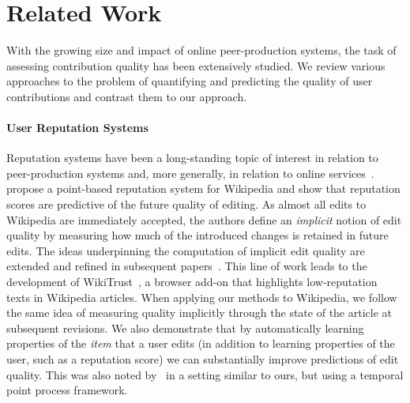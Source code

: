 \section{Related Work}
\label{pps:sec:relwork}

With the growing size and impact of online peer-production systems, the task of assessing contribution quality has been extensively studied.
We review various approaches to the problem of quantifying and predicting the quality of user contributions and contrast them to our approach.

\paragraph{User Reputation Systems}
Reputation systems have been a long-standing topic of interest in relation to peer-production systems and, more generally, in relation to online services~\citep{resnick2000reputation}.
\citet{adler2007content} propose a point-based reputation system for Wikipedia and show that reputation scores are predictive of the future quality of editing.
As almost all edits to Wikipedia are immediately accepted, the authors define an \emph{implicit} notion of edit quality by measuring how much of the introduced changes is retained in future edits.
The ideas underpinning the computation of implicit edit quality are extended and refined in subsequent papers~\citep{adler2008measuring, dealfaro2013content}.
This line of work leads to the development of WikiTrust~\citep{dealfaro2011reputation}, a browser add-on that highlights low-reputation texts in Wikipedia articles.
When applying our methods to Wikipedia, we follow the same idea of measuring quality implicitly through the state of the article at subsequent revisions.
We also demonstrate that by automatically learning properties of the \emph{item} that a user edits (in addition to learning properties of the user, such as a reputation score) we can substantially improve predictions of edit quality.
This was also noted by~\citet{tabibian2017distilling} in a setting similar to ours, but using a temporal point process framework.


